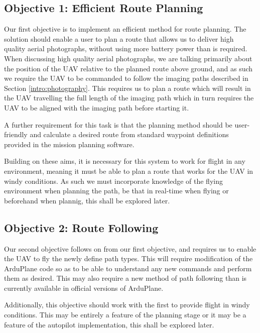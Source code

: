 \subsection{Objective 1: Efficient Route Planning}
\label{intro:obj1}
Our first objective is to implement an efficient method for route planning. The solution should enable a user to plan a route that allows us to deliver high quality aerial photographs, without using more battery power than is required. When discussing high quality aerial photographs, we are talking primarily about the position of the UAV relative to the planned route above ground, and as such we require the UAV to be commanded to follow the imaging paths described in Section \ref{intro:photography}. This requires us to plan a route which will result in the UAV travelling the full length of the imaging path which in turn requires the UAV to be aligned with the imaging path before starting it. 

A further requirement for this task is that the planning method should be user-friendly and calculate a desired route from standard waypoint definitions provided in the mission planning software.

Building on these aims, it is necessary for this system to work for flight in any environment, meaning it must be able to plan a route that works for the UAV in windy conditions. As such we must incorporate knowledge of the flying environment when planning the path, be that in real-time when flying or beforehand when plannig, this shall be explored later.

\subsection{Objective 2: Route Following}
\label{intro:obj2}

Our second objective follows on from our first objective, and requires us to enable the UAV to fly the newly define path types. This will require modification of the ArduPlane code so as to be able to understand any new commands and perform them as desired. This may also require a new method of path following than is currently available in official versions of ArduPlane. 

Additionally, this objective should work with the first to provide flight in windy conditions. This may be entirely a feature of the planning stage or it may be a feature of the autopilot implementation, this shall be explored later.

